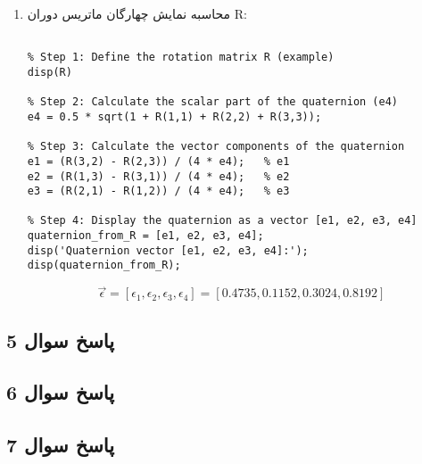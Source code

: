 \begin{enumerate}
\item 
محاسبه نمایش چهارگان ماتریس دوران R:

\begin{latin}
	\begin{lstlisting}[frame=single,style=Matlab-Pyglike]
		
% Step 1: Define the rotation matrix R (example)
disp(R)

% Step 2: Calculate the scalar part of the quaternion (e4)
e4 = 0.5 * sqrt(1 + R(1,1) + R(2,2) + R(3,3));

% Step 3: Calculate the vector components of the quaternion
e1 = (R(3,2) - R(2,3)) / (4 * e4);   % e1
e2 = (R(1,3) - R(3,1)) / (4 * e4);   % e2
e3 = (R(2,1) - R(1,2)) / (4 * e4);   % e3

% Step 4: Display the quaternion as a vector [e1, e2, e3, e4]
quaternion_from_R = [e1, e2, e3, e4];
disp('Quaternion vector [e1, e2, e3, e4]:');
disp(quaternion_from_R);

	\end{lstlisting}
\end{latin}
\[
\vec{\epsilon} = [\epsilon_{1}, \epsilon_{2}, \epsilon_{3}, \epsilon_{4}] = [0.4735, 0.1152, 0.3024, 0.8192]
\]







\end{enumerate}

\subsection{ پاسخ سوال 5}

\subsection{ پاسخ سوال 6}

\subsection{ پاسخ سوال 7}


